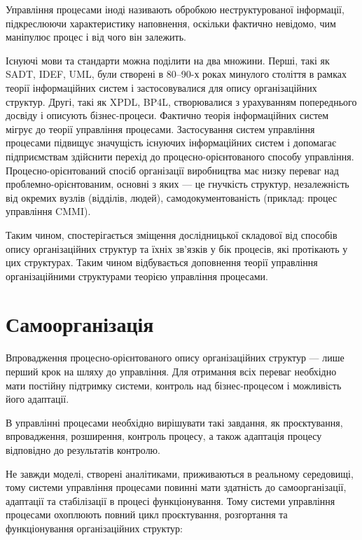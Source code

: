 \documentclass{memoir}
\begin{document}
Управління процесами іноді називають обробкою неструктурованої інформації, підкреслюючи характеристику наповнення, оскільки фактично невідомо, чим маніпулює процес і від чого він залежить.

Існуючі мови та стандарти можна поділити на два множини. Перші, такі як SADT, IDEF, UML, були створені в 80–90-х роках минулого століття в рамках теорії інформаційних систем і застосовувалися для опису організаційних структур. Другі, такі як XPDL, BP4L, створювалися з урахуванням попереднього досвіду і описують бізнес-процеси. Фактично теорія інформаційних систем мігрує до теорії управління процесами. Застосування систем управління процесами підвищує значущість існуючих інформаційних систем і допомагає підприємствам здійснити перехід до процесно-орієнтованого способу управління. Процесно-орієнтований спосіб організації виробництва має низку переваг над проблемно-орієнтованим, основні з яких — це гнучкість структур, незалежність від окремих вузлів (відділів, людей), самодокументованість (приклад: процес управління CMMI).

Таким чином, спостерігається зміщення дослідницької складової від способів опису організаційних структур та їхніх зв’язків у бік процесів, які протікають у цих структурах. Таким чином відбувається доповнення теорії управління організаційними структурами теорією управління процесами.

\section{Самоорганізація}

Впровадження процесно-орієнтованого опису організаційних структур — лише перший крок на шляху до управління. Для отримання всіх переваг необхідно мати постійну підтримку системи, контроль над бізнес-процесом і можливість його адаптації.

В управлінні процесами необхідно вирішувати такі завдання, як проєктування, впровадження, розширення, контроль процесу, а також адаптація процесу відповідно до результатів контролю.

Не завжди моделі, створені аналітиками, приживаються в реальному середовищі, тому системи управління процесами повинні мати здатність до самоорганізації, адаптації та стабілізації в процесі функціонування. Тому системи управління процесами охоплюють повний цикл проєктування, розгортання та функціонування організаційних структур:
\end{document}
